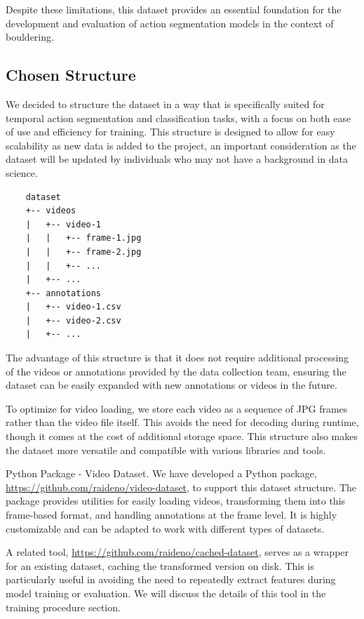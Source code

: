 Despite these limitations, this dataset provides an essential foundation for the development and evaluation of action segmentation models in the context of bouldering.
\subsection{Chosen Structure}

We decided to structure the dataset in a way that is specifically suited for temporal action segmentation and classification tasks, with a focus on both ease of use and efficiency for training. This structure is designed to allow for easy scalability as new data is added to the project, an important consideration as the dataset will be updated by individuals who may not have a background in data science.

\begin{verbatim}
    dataset
    +-- videos
    |   +-- video-1
    |   |   +-- frame-1.jpg
    |   |   +-- frame-2.jpg
    |   |   +-- ...
    |   +-- ...
    +-- annotations
    |   +-- video-1.csv
    |   +-- video-2.csv
    |   +-- ...
\end{verbatim}

The advantage of this structure is that it does not require additional processing of the videos or annotations provided by the data collection team, ensuring the dataset can be easily expanded with new annotations or videos in the future.

To optimize for video loading, we store each video as a sequence of JPG frames rather than the video file itself. This avoids the need for decoding during runtime, though it comes at the cost of additional storage space. This structure also makes the dataset more versatile and compatible with various libraries and tools.

\begin{AIbox}{Python Package - Video Dataset.}
  We have developed a Python package, \href{https://github.com/raideno/video-dataset}{https://github.com/raideno/video-dataset}, to support this dataset structure. The package provides utilities for easily loading videos, transforming them into this frame-based format, and handling annotations at the frame level. It is highly customizable and can be adapted to work with different types of datasets.
\end{AIbox}

A related tool, \href{https://github.com/raideno/cached-dataset}{https://github.com/raideno/cached-dataset}, serves as a wrapper for an existing dataset, caching the transformed version on disk. This is particularly useful in avoiding the need to repeatedly extract features during model training or evaluation. We will discuss the details of this tool in the training procedure section.

